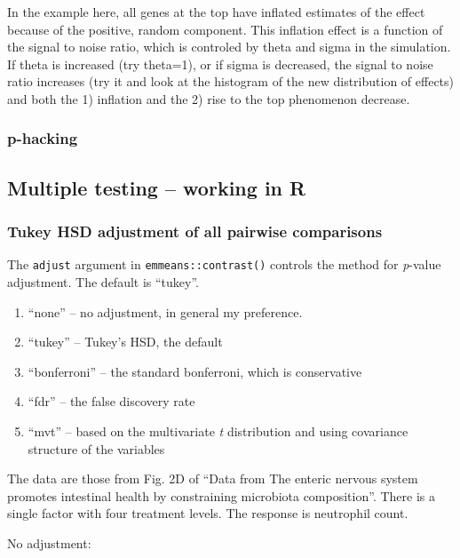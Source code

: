 \documentclass[]{book}
\providecommand{\tightlist}{%
  \setlength{\itemsep}{0pt}\setlength{\parskip}{0pt}}
\begin{document}
In the example here, all genes at the top have inflated estimates of the
effect because of the positive, random component. This inflation effect
is a function of the signal to noise ratio, which is controled by theta
and sigma in the simulation. If theta is increased (try theta=1), or if
sigma is decreased, the signal to noise ratio increases (try it and look
at the histogram of the new distribution of effects) and both the 1)
inflation and the 2) rise to the top phenomenon decrease.

\subsubsection{p-hacking}\label{p-hacking}

\subsection{Multiple testing -- working in
R}\label{multiple-testing-working-in-r}

\subsubsection{Tukey HSD adjustment of all pairwise
comparisons}\label{tukey-hsd-adjustment-of-all-pairwise-comparisons}

The \texttt{adjust} argument in \texttt{emmeans::contrast()} controls
the method for \emph{p}-value adjustment. The default is ``tukey''.

\begin{enumerate}
\def\labelenumi{\arabic{enumi}.}
\tightlist
\item
  ``none'' -- no adjustment, in general my preference.
\item
  ``tukey'' -- Tukey's HSD, the default
\item
  ``bonferroni'' -- the standard bonferroni, which is conservative
\item
  ``fdr'' -- the false discovery rate
\item
  ``mvt'' -- based on the multivariate \emph{t} distribution and using
  covariance structure of the variables
\end{enumerate}

The data are those from Fig. 2D of ``Data from The enteric nervous
system promotes intestinal health by constraining microbiota
composition''. There is a single factor with four treatment levels. The
response is neutrophil count.

No adjustment:
\end{document}
